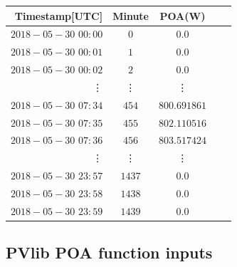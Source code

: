 
\begin{table}[h]

\centering

\begin{tabular}{r|cccc} \hline\hline

Timestamp[UTC] & Minute & POA(W) \\ \hline
$2018-05-30$ $00:00$ &  $0$ & $0.0$\\
$2018-05-30$ $00:01$ &  $1$ & $0.0$\\
$2018-05-30$ $00:02$ &  $2$ & $0.0$\\
\vdots & \vdots & \vdots \\
$2018-05-30$ $ 07:34$ & $454$ & $800.691861$\\
$2018-05-30 $ $07:35$ & $455$ & $802.110516$\\
$2018-05-30 $ $07:36$ & $456$ & $803.517424$\\
\vdots & \vdots & \vdots \\
$2018-05-30$ $ 23:57$ & $1437$ & $0.0$\\
$2018-05-30 $ $23:58$ & $1438$ & $0.0$\\
$2018-05-30 $ $23:59$ & $1439$ & $0.0$\\

\hline\hline
\end{tabular}
\label{table_poa_simulated_format}
\end{table}


\subsection{PVlib POA function inputs} 



